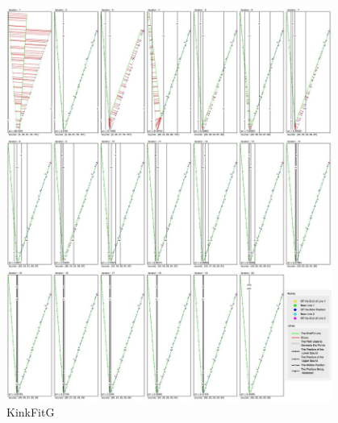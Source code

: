 \begin{figure}[h!]
  \centering
    \includegraphics[width=0.95\textwidth]{Chapter4/Figs/KinkFit_G.jpg}
    \caption{KinkFitG}\label{fig:KinkFitG}
\end{figure}


